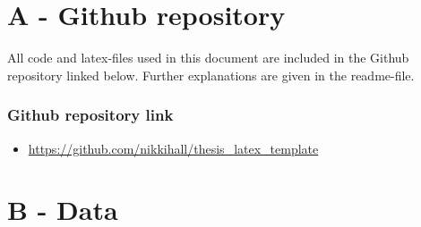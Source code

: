 

\chapter*{A - Github repository}

All code and latex-files used in this document are included in the Github repository linked below. Further explanations are given in the readme-file. 


\subsection*{Github repository link}
\begin{itemize}
    \item \url{https://github.com/nikkihall/thesis_latex_template}
\end{itemize}




\chapter*{B - Data}

\renewcommand{\thefigure}{B.\arabic{figure}}
\setcounter{figure}{0}
\renewcommand{\thetable}{B.\arabic{table}}
\setcounter{table}{0}


